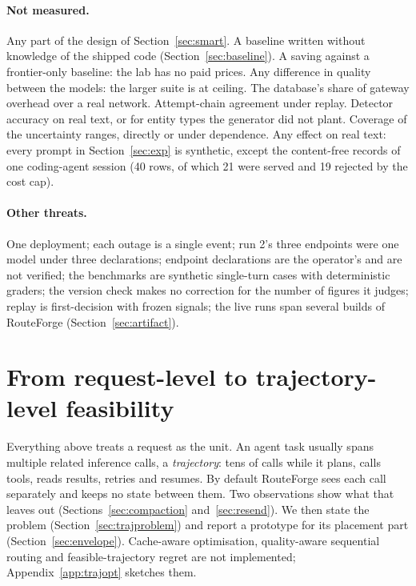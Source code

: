 \documentclass[11pt]{article}
\begin{document}
\paragraph{Not measured.} Any part of the design of Section~\ref{sec:smart}. A baseline written without knowledge of the shipped code
(Section~\ref{sec:baseline}). A saving
against a frontier-only baseline: the lab has no paid prices. Any difference in quality between
the models: the larger suite is at ceiling. The database's share of gateway overhead
over a real network.
Attempt-chain agreement under replay. Detector accuracy on real text, or for entity types the
generator did not plant. Coverage of the uncertainty ranges, directly or under dependence. Any effect on real text: every prompt in
Section~\ref{sec:exp} is synthetic, except the content-free records of one coding-agent session
(40 rows, of which 21 were served and 19 rejected by the cost cap).

\paragraph{Other threats.} One deployment; each outage is a single event; run 2's three
endpoints were one model under three declarations; endpoint declarations are the operator's and
are not verified; the benchmarks are synthetic single-turn cases with deterministic graders; the
version check makes no correction for the number of figures it judges; replay is first-decision
with frozen signals; the live runs span several builds of RouteForge (Section~\ref{sec:artifact}).

\section{From request-level to trajectory-level feasibility}
\label{sec:traj}

Everything above treats a request as the unit. An agent task usually spans multiple related
inference calls, a \emph{trajectory}: tens of calls while it plans, calls tools, reads results,
retries and resumes. By default RouteForge sees each call separately and keeps no state between them. Two
observations show what that leaves out (Sections~\ref{sec:compaction} and~\ref{sec:resend}). We
then state the problem (Section~\ref{sec:trajproblem}) and report a prototype for its placement
part (Section~\ref{sec:envelope}). Cache-aware optimisation, quality-aware sequential routing and
feasible-trajectory regret are not implemented; Appendix~\ref{app:trajopt} sketches them.
\end{document}
